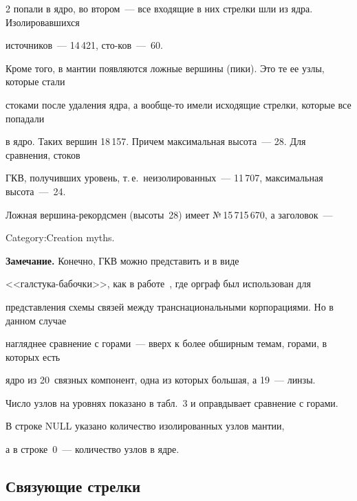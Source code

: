 \begin{multicols}{2}
попали в ядро, во втором~--- все входящие в них стрелки шли из ядра. Изолировавшихся 

источников~--- 14\,421, сто-\linebreak ков~---~60.

{ %



}

   

   Кроме того, в мантии появляются ложные вершины (пики). Это те ее узлы, которые стали 

стоками после удаления ядра, а вообще-то имели исходящие стрелки, которые все попадали 

в ядро. Таких вершин 18\,157. Причем максимальная высота~--- 28. Для сравнения, стоков 

ГКВ, получивших уровень, т.\,е.\ неизолированных~--- 11\,707, максимальная высота~---~24.

   

   Ложная вершина-рекордсмен (высоты~28) имеет №\,15\,715\,670, а заголовок~--- 

Category:Creation myths. 

   

   \medskip

   

   \noindent

   \textbf{Замечание.} Конечно, ГКВ можно представить и в виде 

   <<гал\-сту\-ка-ба\-боч\-ки>>, как в работе~\cite{7-shk}, где орграф был использован для 

представления схемы связей между транснациональными корпорациями. Но в данном случае 

нагляднее сравнение с горами~--- вверх к более обширным темам, горами, в которых есть 

ядро из 20~связных компонент, одна из которых большая, а 19~--- линзы.

   

   Число узлов на уровнях показано в табл.~3 и оправдывает сравнение с горами.

   В  строке NULL указано количество изолированных узлов мантии, 

а в строке~0~--- количество узлов в ядре.



\subsection*{Связующие стрелки}




\end{multicols}
